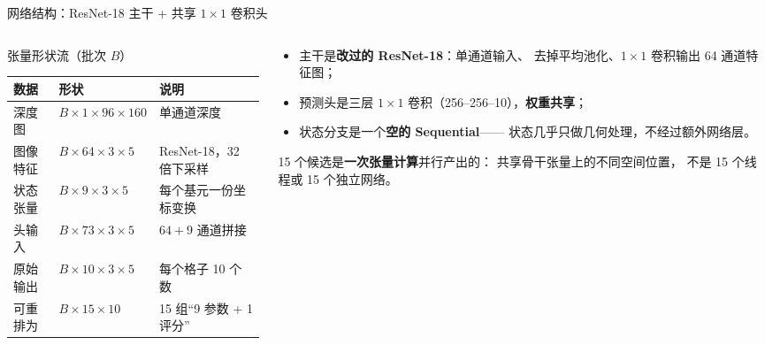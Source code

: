 \begin{frame}{网络结构：ResNet-18 主干 + 共享 $1\times1$ 卷积头}
  \small
  \begin{columns}[t]
    \begin{column}{0.55\textwidth}
      \begin{block}{张量形状流（批次 $B$）}
        \scriptsize
        \begin{tabular}{@{}lll@{}}
          \toprule
          数据 & 形状 & 说明 \\
          \midrule
          深度图 & $B{\times}1{\times}96{\times}160$ & 单通道深度 \\
          图像特征 & $B{\times}64{\times}3{\times}5$ & ResNet-18，32 倍下采样 \\
          状态张量 & $B{\times}9{\times}3{\times}5$ & 每个基元一份坐标变换 \\
          头输入 & $B{\times}73{\times}3{\times}5$ & $64+9$ 通道拼接 \\
          原始输出 & $B{\times}10{\times}3{\times}5$ & 每个格子 10 个数 \\
          可重排为 & $B{\times}15{\times}10$ & 15 组“9 参数 + 1 评分” \\
          \bottomrule
        \end{tabular}
      \end{block}
    \end{column}
    \begin{column}{0.41\textwidth}
      \begin{itemize}\tight
        \item 主干是\textbf{改过的 ResNet-18}：单通道输入、
              去掉平均池化、$1\times1$ 卷积输出 64 通道特征图；
        \item 预测头是三层 $1\times1$ 卷积（256–256–10），\textbf{权重共享}；
        \item 状态分支是一个\textbf{空的 Sequential}——
              状态几乎只做几何处理，不经过额外网络层。
      \end{itemize}
      \begin{reading}
        \scriptsize
        15 个候选是\textbf{一次张量计算}并行产出的：
        共享骨干张量上的不同空间位置，
        不是 15 个线程或 15 个独立网络。
      \end{reading}
    \end{column}
  \end{columns}
\end{frame}


